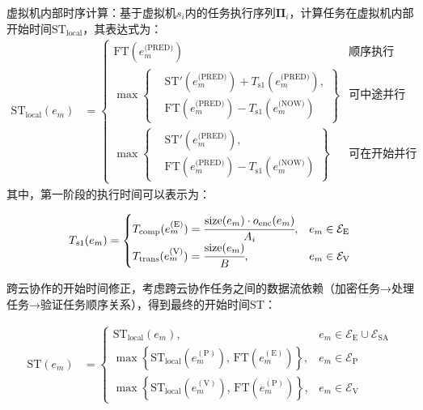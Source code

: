 虚拟机内部时序计算：基于虚拟机$s_i$内的任务执行序列$\mathbf{\Pi}_i$，计算任务在虚拟机内部开始时间$\mathrm{ST}_{\mathrm{local}}$，其表达式为：
\begin{align}
    \mathrm{ST}_{\mathrm{local}}(e_m) &=
    \begin{cases}
        \text{FT}(e_m^\text{(PRED)}) & \text{顺序执行} \\
        \max \left\{
            \begin{aligned}
                &\text{ST}'(e_m^\text{(PRED)}) + T_{\text{s1}}(e_m^\text{(PRED)}), \\
                &\text{FT}(e_m^\text{(PRED)}) - T_{\text{s1}}(e_m^\text{(NOW)})
            \end{aligned}
        \right\} & \text{可中途并行} \\
        \max \left\{
            \begin{aligned}
                &\text{ST}'(e_m^\text{(PRED)}), \\
                &\text{FT}(e_m^\text{(PRED)}) - T_{\text{s1}}(e_m^\text{(NOW)})
            \end{aligned}
        \right\}  & \text{可在开始并行}
    \end{cases}
    \label{eq:st_local}
\end{align}
其中，第一阶段的执行时间可以表示为：

\begin{equation}
    T_{s1}(e_m) =
    \begin{cases}
        T_{\mathrm{comp}}(e_m^{(\mathrm{E})}) = \cfrac{\text{size}(e_m) \cdot o_{\text{enc}}(e_m)}{A_i}, & e_m \in \mathcal{E}_{\mathrm{E}} \\
        T_{\mathrm{trans}}(e_m^{(\mathrm{V})}) = \cfrac{\text{size}(e_m)}{B}, & e_m \in \mathcal{E}_{\mathrm{V}}
    \end{cases}
    \label{eq:stage1_time}
\end{equation}

跨云协作的开始时间修正，考虑跨云协作任务之间的数据流依赖（加密任务→处理任务→验证任务顺序关系），得到最终的开始时间$\mathrm{ST}$：

\begin{align}
    \mathrm{ST}(e_m) &=
    \begin{cases}
        \mathrm{ST}_{\mathrm{local}}(e_m), & e_m \in \mathcal{E}_{\mathrm{E}} \cup \mathcal{E}_{\mathrm{SA}} \\
        \max\left\{ \mathrm{ST}_{\mathrm{local}}(e_m^{(\mathrm{P})}),\, \mathrm{FT}(e_m^{(\mathrm{E})}) \right\}, & e_m \in \mathcal{E}_{\mathrm{P}} \\
        \max\left\{ \mathrm{ST}_{\mathrm{local}}(e_m^{(\mathrm{V})}),\, \mathrm{FT}(e_m^{(\mathrm{P})}) \right\}, & e_m \in \mathcal{E}_{\mathrm{V}}
    \end{cases}
    \label{eq:st_global}
\end{align}

